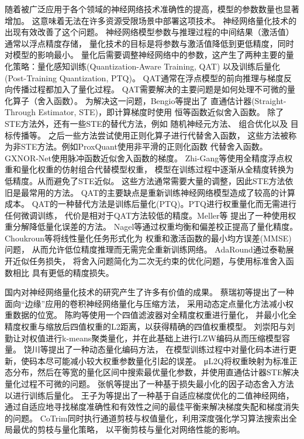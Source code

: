 随着被广泛应用于各个领域的神经网络技术准确性的提高，模型的参数数量也显著增加。
这意味着无法在许多资源受限场景中部署这项技术。
神经网络量化技术的出现有效改善了这个问题。
神经网络模型参数与推理过程的中间结果（激活值）通常以浮点精度存储，
量化技术的目标是将参数与激活值降低到更低精度，同时对模型的影响最小。
量化后需要调整神经网络中的参数，这产生了两种主要的量化策略：量化感知训练(Quantization-Aware Training, QAT)
以及训练后量化(Post-Training Quantization, PTQ)。
QAT通常在浮点模型的前向推理与梯度反向传播过程都加入了量化过程。
QAT需要解决的主要问题是如何处理不可微的量化算子（舍入函数）。
为解决这一问题，Bengio等\cite{bengio2013estimating}提出了
直通估计器(Straight-Through Estimator, STE)，即计算梯度时使用
恒等函数近似舍入函数。
除了STE方法外，还有一些STE的替代方法，例如
随机神经元方法\cite{bengio2013estimating}、
组合优化\cite{friesen2017deep}以及
目标传播\cite{lee2015difference}等。
之后一些方法尝试使用正则化算子进行代替舍入函数，
这些方法被称为非STE方法。例如ProxQuant\cite{bai2019quantized}使用非平滑的正则化函数
代替舍入函数。GXNOR-Net\cite{deng2018gxnor}使用脉冲函数近似舍入函数的梯度。
Zhi-Gang等\cite{liu2019learning}使用全精度浮点权重和量化权重的仿射组合代替模型权重，
模型在训练过程中逐渐从全精度转换为低精度。从而避免了STE近似。
这些方法通常需要大量的调整，因此STE方法依旧是最常用的方法。
QAT的主要缺点是重新训练神经网络模型造成了较高的计算成本。
QAT的一种替代方法是训练后量化(PTQ)。PTQ进行权重量化而无需进行任何微调训练，
代价是相对于QAT方法较低的精度。Meller等\cite{meller2019same}
提出了一种使用权重分解降低量化误差的方法。
Nagel等\cite{nagel2019data}通过权重均衡和偏差校正提高了量化精度。
Choukroun等\cite{choukroun2019low}将线性量化任务形式化为
权重和激活函数的最小均方误差(MMSE)问题，
从而允许低位精度推理而无需完全重新训练网络。
AdaRound\cite{nagel2020up}通过泰勒展开近似任务损失，
将舍入问题简化为二次无约束的优化问题，与使用标准舍入函数相比
具有更低的精度损失。

国内对神经网络量化技术的研究产生了许多有价值的成果。
蔡瑞初等\cite{JSJY201809002}提出了一种面向“边缘”应用的卷积神经网络量化与压缩方法，
采用动态定点量化方法减小权重数据的位宽。
陈昀等\cite{XDKD201902022}使用一个四值滤波器对全精度权重进行量化，
并最小化全精度权重与缩放后四值权重的L2距离，以获得精确的四值权重模型。
刘崇阳与刘勤让\cite{JSJC201909030}对权值进行k-means聚类量化，并在此基础上进行LZW编码从而压缩模型容量。
饶川等\cite{MOTO201910014}提出了一种动态量化编码方法，
在模型训练过程中对量化码本进行更新，使码本尽可能减小较大权重参数量化引起的误差。
μL2Q\cite{RJXB202108011}将权重映射为标准正态分布，然后在等宽的量化区间中搜索最优量化参数，并使用直通估计器STE解决量化过程不可微的问题。
张帆等\cite{TXXB202204011}提出了一种基于损失最小化的因子动态舍入方法以进行训练后量化。
王子为等\cite{DZXU202302001}提出了一种基于自适应梯度优化的二值神经网络，
通过自适应地寻找梯度准确性和有效性之间的最佳平衡来解决梯度失配和梯度消失的问题。
CoTrim\cite{JSGG202506018}同时执行通道剪枝与权值量化，利用深度强化学习算法搜索出全局最优的剪枝与量化策略，
以平衡剪枝与量化对网络性能的影响。

